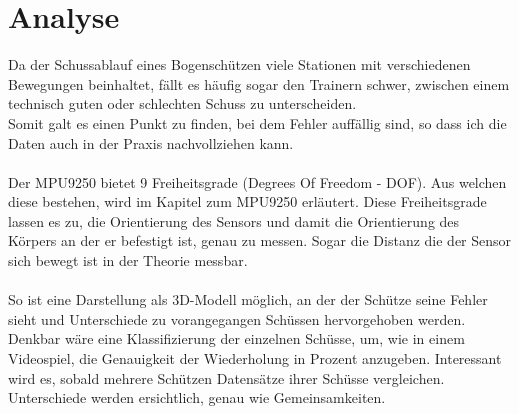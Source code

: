 \section{Analyse}
Da der Schussablauf eines Bogenschützen viele Stationen mit verschiedenen Bewegungen 
beinhaltet, fällt es häufig sogar den Trainern schwer, zwischen einem technisch guten
oder schlechten Schuss zu unterscheiden.\\ 
Somit galt es einen Punkt zu finden, bei dem Fehler auffällig sind, so dass ich die Daten auch in 
der Praxis nachvollziehen kann.\\
\\
Der MPU9250 bietet 9 Freiheitsgrade (Degrees Of Freedom - DOF). Aus welchen diese bestehen, wird
im Kapitel zum MPU9250 erläutert. Diese Freiheitsgrade lassen es zu, die Orientierung des Sensors 
und damit die Orientierung des Körpers an der er befestigt ist, genau zu messen. Sogar die Distanz 
die der Sensor sich bewegt ist in der Theorie messbar.\\
\\
So ist eine Darstellung als 3D-Modell möglich, an der der Schütze seine Fehler sieht und Unterschiede
zu vorangegangen Schüssen hervorgehoben werden. \\
Denkbar wäre eine Klassifizierung der einzelnen Schüsse, um, wie in einem Videospiel, die Genauigkeit
der Wiederholung in Prozent anzugeben. Interessant wird es, sobald mehrere Schützen Datensätze
ihrer Schüsse vergleichen. Unterschiede werden ersichtlich, genau wie Gemeinsamkeiten.\\

